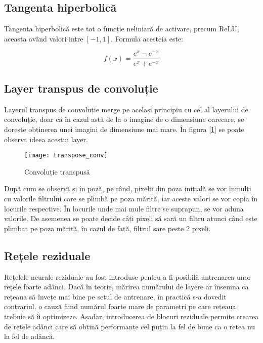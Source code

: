 \subsection{Tangenta hiperbolică}
\label{sb:tanh}
Tangenta hiperbolică \cite{wiki_tanh} este tot o funcție neliniară de activare, precum ReLU, aceasta având valori intre $[-1, 1]$. Formula acesteia este:

\begin{equation}
f(x) = \frac{e^x - e^{-x}}{e^x + e^{-x}}
\end{equation}

\subsection{Layer transpus de convoluție}
\label{sb:transpose_convolution}
Layerul transpus de convoluție merge pe același principiu cu cel al layerului de convoluție, doar că în cazul astă de la o imagine de o dimensiune oarecare, se dorește obținerea unei imagini de dimensiune mai mare. În figura [\ref{fig:transpose_conv}] se poate observa ideea acestui layer.

\begin{figure}[H]
		\centering
        \texttt{[image: transpose\_conv]}
        \caption{Convoluție transpusă \cite{transpose_conv}}
        \label{fig:transpose_conv}
\end{figure}

După cum se observă și în poză, pe rând, pixelii din poza inițială se vor înmulți cu valorile filtrului care se plimbă pe poza mărită, iar aceste valori se vor copia în locurile respective. În locurile unde mai mule filtre se suprapun, se vor aduna valorile. De asemenea se poate decide câți pixeli să sară un filtru atunci când este plimbat pe poza mărită, în cazul de față, filtrul sare peste 2 pixeli.

\subsection{Rețele reziduale}
\label{sb:resnet}
Rețelele neurale reziduale \cite{coursera_deep_learning} au fost introduse pentru a fi posibilă antrenarea unor rețele foarte adânci. Dacă în teorie, mărirea numărului de layere ar însemna ca rețeaua să învețe mai bine pe setul de antrenare, în practică s-a dovedit contrariul, o cauză fiind numărul foarte mare de parametri pe care rețeaua trebuie să îi optimizeze. Așadar, introducerea de blocuri reziduale permite crearea de rețele adânci care să obțină performanțe cel puțin la fel de bune ca o rețea nu la fel de adâncă.

